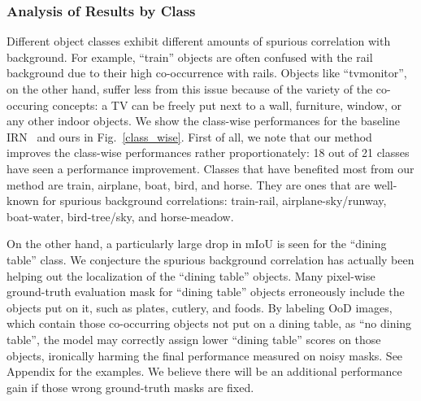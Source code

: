 \documentclass[10pt,twocolumn,letterpaper]{article}
\begin{document}
\begin{table*}[t]
\begin{minipage}{0.3\linewidth}
{\subsubsection{Analysis of Results by Class}
\vspace{-0.2em}
Different object classes exhibit different amounts of spurious correlation with background. 
For example, ``train'' objects are often confused with the rail background due to their high co-occurrence with rails. 
Objects like ``tvmonitor'', on the other hand, suffer less from this issue because of the variety of the co-occuring concepts: a TV can be freely put next to a wall, furniture, window, or any other indoor objects.
We show the class-wise performances for the baseline IRN~\cite{ahn2019weakly} and ours in
Fig.~\ref{class_wise}.
First of all, we note that our method improves the class-wise performances rather proportionately: 18 out of 21 classes have seen a performance improvement.
Classes that have benefited most from our method are train, airplane, boat, bird, and horse. 
They are ones that are well-known for spurious background correlations: 
train-rail, airplane-sky/runway, boat-water, bird-tree/sky, and horse-meadow.


On the other hand, a particularly large drop in mIoU is seen for the ``dining table'' class.
We conjecture the spurious background correlation has actually been helping out the localization of the ``dining table'' objects. 
Many pixel-wise ground-truth evaluation mask for ``dining table'' objects erroneously include the objects put on it, such as plates, cutlery, and foods.
By labeling OoD images, which contain those co-occurring objects not put on a dining table, as ``no dining table'', the model may correctly assign lower ``dining table'' scores on those objects, ironically harming the final performance measured on noisy masks.
See Appendix for the examples.
We believe there will be an additional performance gain if those wrong ground-truth masks are fixed.




\vspace{-0.9em}
}
\end{minipage}
\end{table*}
\end{document}
